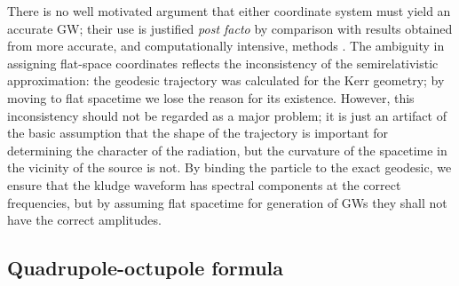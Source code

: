 \documentclass[useAMS,usedcolumn,usegraphicx,usenatbib]{mn2e}
\begin{document}
There is no well motivated argument that either coordinate system must yield an accurate GW; their use is justified {\it post facto} by comparison with results obtained from more accurate, and computationally intensive, methods \citep{Gair2005, Babak2007}. The ambiguity in assigning flat-space coordinates reflects the inconsistency of the semirelativistic approximation: the geodesic trajectory was calculated for the Kerr geometry; by moving to flat spacetime we lose the reason for its existence. However, this inconsistency should not be regarded as a major problem; it is just an artifact of the basic assumption that the shape of the trajectory is important for determining the character of the radiation, but the curvature of the spacetime in the vicinity of the source is not. By binding the particle to the exact geodesic, we ensure that the kludge waveform has spectral components at the correct frequencies, but by assuming flat spacetime for generation of GWs they shall not have the correct amplitudes.

\subsection{Quadrupole-octupole formula}
\end{document}
